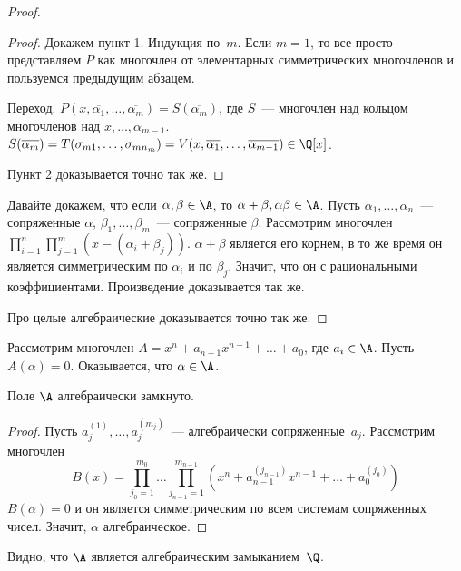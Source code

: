 \begin{proof}
\begin{proof}
    Докажем пункт 1. Индукция по~$m$. Если $m = 1$, то все просто~—
    представляем $P$ как многочлен от элементарных симметрических
    многочленов и пользуемся предыдущим абзацем.
    
    Переход. $P(x, \overline{\alpha_1}, \ldots, \overline{\alpha_m}) =
    S(\overline{\alpha_m})$, где $S$~— многочлен над кольцом
    многочленов над $x, \ldots,
    \overline{\alpha_{m-1}}$. $S(\overline{\alpha_m}) = T(\sigma_{m1},
    \ldots, \sigma_{mn_m}) = V(x, \overline{\alpha_1}, \ldots,
    \overline{\alpha_{m-1}}) \in \Q[x]$.
    
    Пункт 2 доказывается точно так же.
  \end{proof}
  Давайте докажем, что если $\alpha, \beta \in \A$, то $\alpha +
  \beta, \alpha \beta \in \A$. Пусть $\alpha_1, \ldots, \alpha_n$~—
  сопряженные $\alpha$, $\beta_1, \ldots, \beta_m$~— сопряженные
  $\beta$. Рассмотрим многочлен $\prod_{i=1}^n \prod_{j=1}^m (x -
  (\alpha_i + \beta_j))$. $\alpha + \beta$ является его корнем, в то
  же время он является симметрическим по $\alpha_i$ и по
  $\beta_j$. Значит, что он с рациональными
  коэффициентами. Произведение доказывается так же.
  
  Про целые алгебраические доказывается точно так же.
\end{proof}

Рассмотрим многочлен $A = x^n + a_{n-1}x^{n-1} + \ldots + a_0$, где
$a_i \in \A$. Пусть $A(\alpha) = 0$. Оказывается, что $\alpha \in \A$.

\begin{theorem}
  Поле $\A$ алгебраически замкнуто.
\end{theorem}
\begin{proof}
  Пусть $a_j^{(1)}, \ldots, a_j^{(m_j)}$~— алгебраически
  сопряженные~$a_j$. Рассмотрим многочлен
  $$ B(x) = \prod_{j_0 = 1}^{m_0} \ldots \prod_{j_{n-1} = 1}^{m_{n-1}}
  \left( x^n + a_{n-1}^{(j_{n-1})} x^{n-1} + \ldots + a_0^{(j_0)}
  \right)
  $$ $B(\alpha) = 0$ и он является симметрическим по всем системам
  сопряженных чисел. Значит, $\alpha$ алгебраическое.
\end{proof}

Видно, что $\A$ является алгебраическим замыканием~$\Q$.



